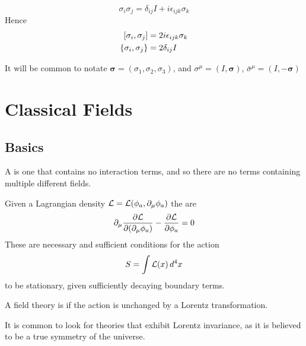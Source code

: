 \documentclass{article}
\begin{document}
\begin{fact}
\[
\sigma_i \sigma_j = \delta_{ij}I +i\epsilon_{ijk}\sigma_k
\]
Hence 
\begin{align*}
    \comm[\sigma_i]{\sigma_j} &= 2i\eps_{ijk}\sigma_k \\
    \acomm[\sigma_i]{\sigma_j} &= 2\delta_{ij}I
\end{align*}
\end{fact}

\begin{fact}
It will be common to notate $\bm{\sigma}=(\sigma_1, \sigma_2, \sigma_3)$, and $\sigma^\mu=(I,\bm{\sigma})$, $\bar{\sigma}^\mu=(I, -\bm{\sigma})$
\end{fact}
\section{Classical Fields}

\subsection{Basics}

\begin{definition}
A  is one that contains no interaction terms, and so there are no terms containing multiple different fields. 
\end{definition}

\begin{definition}
Given a Lagrangian density $\mathcal{L}=\mathcal{L}(\phi_a,\del_\mu \phi_a)$ the  are 
\[
\del_\mu \pd[\mc{L}]{(\del_\mu \phi_a)}-\pd[\mc{L}]{\phi_a}=0
\]
These are necessary and sufficient conditions for the action 
\[
S=\int \mc{L}(x) \, d^4x
\]
to be stationary, given sufficiently decaying boundary terms. 
\end{definition}

\begin{definition}
A field theory is  if the action is unchanged by a Lorentz transformation. 
\end{definition}

\begin{idea}
It is common to look for theories that exhibit Lorentz invariance, as it is believed to be a true symmetry of the universe.
\end{idea}
\end{document}

